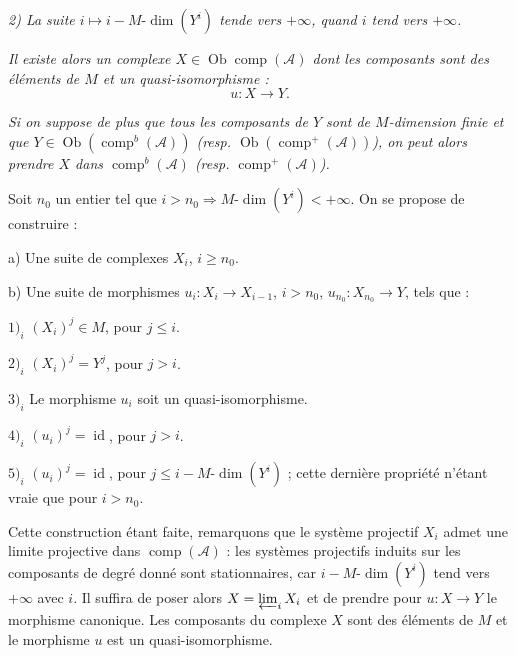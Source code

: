 \clearpage
{}%
\begingroup\small\setlength{\parskip}{0pt}\setlength{\emergencystretch}{1.5em}
\setlength{\abovedisplayskip}{4pt plus 2pt minus 2pt}%
\setlength{\belowdisplayskip}{4pt plus 2pt minus 2pt}%

\noindent\textit{2) La suite $i\longmapsto i-M\text{-}\dim(Y^i)$ tende vers
$+\infty$, quand $i$ tend vers $+\infty$.}

\textit{Il existe alors un complexe
$X\in\operatorname{Ob}\operatorname{comp}(\mathcal A)$ dont les composants
sont des éléments de $M$ et un quasi-isomorphisme :}
\[
u\colon X\longrightarrow Y.
\]

\textit{Si on suppose de plus que tous les composants de $Y$ sont de
$M$-dimension finie et que
$Y\in\operatorname{Ob}(\operatorname{comp}^{b}(\mathcal A))$
(resp. $\operatorname{Ob}(\operatorname{comp}^{+}(\mathcal A))$), on peut
alors prendre $X$ dans $\operatorname{comp}^{b}(\mathcal A)$
(resp. $\operatorname{comp}^{+}(\mathcal A)$).}

Soit $n_0$ un entier tel que
$i>n_0\Rightarrow M\text{-}\dim(Y^i)<+\infty$. On se propose de construire :

\noindent a) Une suite de complexes $X_i$, $i\geq n_0$.

\noindent b) Une suite de morphismes
$u_i\colon X_i\longrightarrow X_{i-1}$, $i>n_0$,
$u_{n_0}\colon X_{n_0}\longrightarrow Y$, tels que :

\noindent $1)_i$ $(X_i)^j\in M$, pour $j\leq i$.

\noindent $2)_i$ $(X_i)^j=Y^j$, pour $j>i$.

\noindent $3)_i$ Le morphisme $u_i$ soit un quasi-isomorphisme.

\noindent $4)_i$ $(u_i)^j=\operatorname{id}$, pour $j>i$.

\noindent $5)_i$ $(u_i)^j=\operatorname{id}$, pour
$j\leq i-M\text{-}\dim(Y^i)$ ; cette dernière propriété n'étant vraie que
pour $i>n_0$.

Cette construction étant faite, remarquons que le système projectif $X_i$
admet une limite projective dans $\operatorname{comp}(\mathcal A)$ : les
systèmes projectifs induits sur les composants de degré donné sont
stationnaires, car $i-M\text{-}\dim(Y^i)$ tend vers $+\infty$ avec $i$. Il
suffira de poser alors $X=\varprojlim_i X_i$ et de prendre pour
$u\colon X\longrightarrow Y$ le morphisme canonique. Les composants du
complexe $X$ sont des éléments de $M$ et le morphisme $u$ est un
quasi-isomorphisme.

